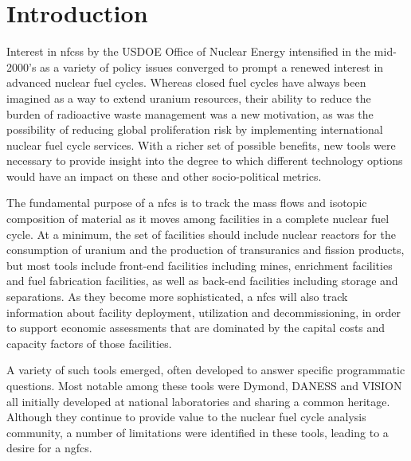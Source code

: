 \chapter{Introduction}

Interest in \glspl{nfcs} by the \gls{USDOE} Office of Nuclear Energy intensified
in the mid-2000's as a variety of policy issues converged to prompt a renewed
interest in advanced nuclear fuel cycles.  Whereas closed fuel cycles have
always been imagined as a way to extend uranium resources, their ability to
reduce the burden of radioactive waste management was a new motivation, as was
the possibility of reducing global proliferation risk by implementing
international nuclear fuel cycle services.  With a richer set of possible
benefits, new tools were necessary to provide insight into the degree to which
different technology options would have an impact on these and other
socio-political metrics.

The fundamental purpose of a \gls{nfcs} is to track the mass flows and
isotopic composition of material as it moves among facilities in a complete
nuclear fuel cycle.  At a minimum, the set of facilities should include
nuclear reactors for the consumption of uranium and the production of
transuranics and fission products, but most tools include front-end
facilities including mines, enrichment facilities and fuel fabrication
facilities, as well as back-end facilities including storage and separations.
As they become more sophisticated, a \gls{nfcs} will also track information
about facility deployment, utilization and decommissioning, in order to
support economic assessments that are dominated by the capital costs and
capacity factors of those facilities.

A variety of such tools emerged, often developed to answer specific
programmatic questions.  Most notable among these tools were
Dymond, DANESS and VISION all
initially developed at national laboratories and sharing a common heritage.
Although they continue to provide value to the nuclear fuel cycle analysis
community, a number of limitations were identified in these tools, leading to
a desire for a \gls{ngfcs}.

